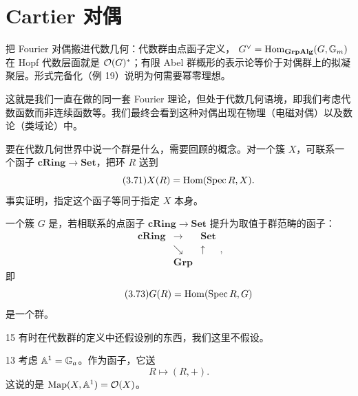 \section{Cartier 对偶}

\begin{sectionkey}
把 Fourier 对偶搬进代数几何：代数群由点函子定义， $G^{\vee}=\mathrm{Hom}_{\mathbf{GrpAlg}}(G,\mathbb{G}_m)$ 在 Hopf 代数层面就是 $\mathcal{O}(G)^{*}$；有限 Abel 群概形的表示论等价于对偶群上的拟凝聚层。形式完备化（例 19）说明为何需要幂零理想。
\end{sectionkey}

这就是我们一直在做的同一套 Fourier 理论，但处于代数几何语境，即我们考虑代数函数而非连续函数等。我们最终会看到这种对偶出现在物理（电磁对偶）以及数论（类域论）中。

要在代数几何世界中说一个群是什么，需要回顾的概念。对一个簇 $X$，可联系一个函子 $\mathbf{cRing}\to\mathbf{Set}$，把环 $R$ 送到
\begin{equation}\tag{3.71}
X(R)=\mathrm{Hom}(\mathrm{Spec}\,R,X).
\end{equation}
事实证明，指定这个函子等同于指定 $X$ 本身。

一个簇 $G$ 是，若相联系的点函子 $\mathbf{cRing}\to\mathbf{Set}$ 提升为取值于群范畴的函子：
\begin{equation}\tag{3.72}
\begin{array}{ccc}
\mathbf{cRing} & \longrightarrow & \mathbf{Set}\\
& \searrow & \uparrow\\
& \mathbf{Grp} &
\end{array},
\end{equation}
即
\begin{equation}\tag{3.73}
G(R)=\mathrm{Hom}(\mathrm{Spec}\,R,G)
\end{equation}
是一个群。

\begin{srcrem}{15}
有时在代数群的定义中还假设别的东西，我们这里不假设。
\end{srcrem}

\begin{srcex}{13}
考虑 $\mathbb{A}^1=\mathbb{G}_a$。作为函子，它送
\begin{equation}\tag{3.74}
R\mapsto (R,+).
\end{equation}
这说的是 $\operatorname{Map}(X,\mathbb{A}^1)=\mathcal{O}(X)$。
\end{srcex}

